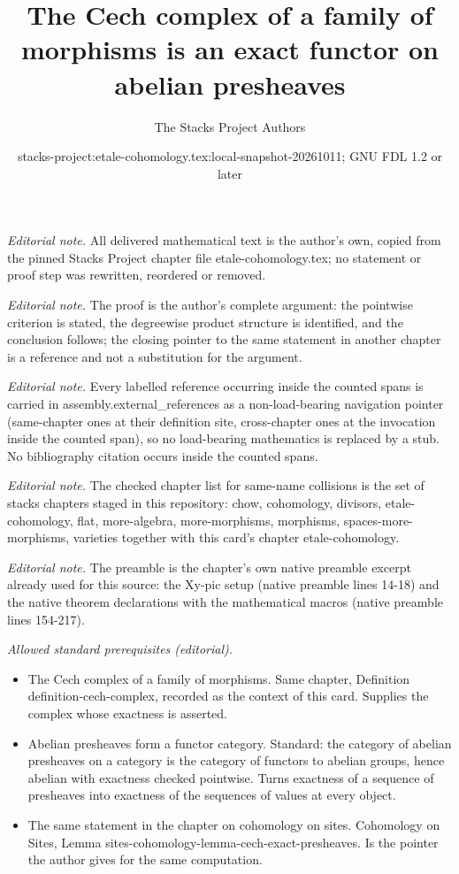 \documentclass[10pt,a4paper]{amsart}
\title{The Cech complex of a family of morphisms is an exact functor on abelian presheaves}
\author{The Stacks Project Authors}
\date{stacks-project:etale-cohomology.tex:local-snapshot-20261011; GNU FDL 1.2 or later}
\theoremstyle{plain}
\theoremstyle{definition}
\theoremstyle{remark}
\numberwithin{equation}{subsection}
\begin{document}
\maketitle
\noindent\textit{Editorial note.} All delivered mathematical text is the author's own, copied from the pinned Stacks Project chapter file etale-cohomology.tex; no statement or proof step was rewritten, reordered or removed.\par\medskip
\noindent\textit{Editorial note.} The proof is the author's complete argument: the pointwise criterion is stated, the degreewise product structure is identified, and the conclusion follows; the closing pointer to the same statement in another chapter is a reference and not a substitution for the argument.\par\medskip
\noindent\textit{Editorial note.} Every labelled reference occurring inside the counted spans is carried in assembly.external\_references as a non-load-bearing navigation pointer (same-chapter ones at their definition site, cross-chapter ones at the invocation inside the counted span), so no load-bearing mathematics is replaced by a stub. No bibliography citation occurs inside the counted spans.\par\medskip
\noindent\textit{Editorial note.} The checked chapter list for same-name collisions is the set of stacks chapters staged in this repository: chow, cohomology, divisors, etale-cohomology, flat, more-algebra, more-morphisms, morphisms, spaces-more-morphisms, varieties together with this card's chapter etale-cohomology.\par\medskip
\noindent\textit{Editorial note.} The preamble is the chapter's own native preamble excerpt already used for this source: the Xy-pic setup (native preamble lines 14-18) and the native theorem declarations with the mathematical macros (native preamble lines 154-217).\par\medskip
\noindent\textit{Allowed standard prerequisites (editorial).}\begin{itemize}
\item The Cech complex of a family of morphisms. Same chapter, Definition definition-cech-complex, recorded as the context of this card. Supplies the complex whose exactness is asserted.
\item Abelian presheaves form a functor category. Standard: the category of abelian presheaves on a category is the category of functors to abelian groups, hence abelian with exactness checked pointwise. Turns exactness of a sequence of presheaves into exactness of the sequences of values at every object.
\item The same statement in the chapter on cohomology on sites. Cohomology on Sites, Lemma sites-cohomology-lemma-cech-exact-presheaves. Is the pointer the author gives for the same computation.
\end{itemize}\medskip
\end{document}
